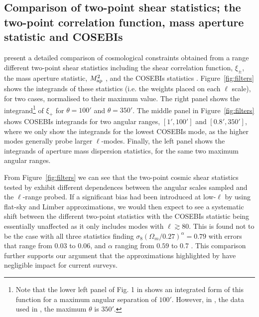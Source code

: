 \subsection{Comparison of two-point shear statistics; the two-point correlation function, mass aperture statistic and COSEBIs}
\citet{kilbinger/etal:2013} present a detailed comparison of cosmological constraints obtained from a range different two-point shear statistics including the shear correlation function, $\xi_\pm$, the mass aperture statistic, $M_ {\rm ap}^2$ \citep{schneider/etal:1998}, and the COSEBIs statistics \citep{schneider/etal:2010}.  Figure~\ref{fig:filters} shows the integrands of these statistics (i.e. the weights placed on each $\ell$ scale),  for two cases, normalised to their maximum value.  The right panel shows the integrand\footnote{Note that the lower left panel of Fig. 1 in \citet{kitching/etal:2016} shows an integrated form of this function for a maximum
angular separation of $100'$. However, in \citet{kilbinger/etal:2013}, the data used in \citet{kitching/etal:2016}, 
the maximum $\theta$ is $350'$.} of $\xi_+$ for $\theta=100'$ and $\theta=350'$. The middle panel in Figure~\ref{fig:filters} shows COSEBIs integrands for two angular ranges, $[1',100']$ and $[0.8',350']$, where we only show the integrands for the lowest COSEBIs mode, as the higher modes generally probe larger $\ell$-modes.  Finally, the left panel shows the integrands of aperture mass dispersion statistics, for the same two maximum angular ranges.

From Figure~\ref{fig:filters} we can see that the two-point cosmic shear statistics tested by \citet{kilbinger/etal:2013} exhibit different dependences between the angular scales sampled and the $\ell$-range probed.   
If a significant bias had been introduced at low-$\ell$ by using flat-sky and Limber approximations, we would then expect to see a systematic shift between the different two-point statistics with the COSEBIs statistic being essentially unaffected as it only includes modes with $\ell \gtrsim 80$.  This is found not to be the case with all three statistics finding $\sigma_8 (\Omega_m/0.27)^\alpha = 0.79$ with errors that range from $0.03$ to $0.06$, and $\alpha$ ranging from $0.59$ to 0.7 \citep[see Table 5 of][]{kilbinger/etal:2013}.  This comparison further supports our argument that the approximations highlighted by \citet{kitching/etal:2016} have negligible impact for current surveys.

